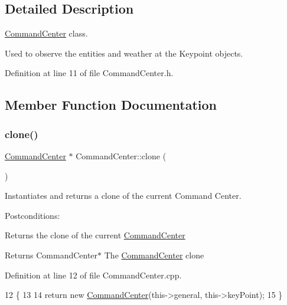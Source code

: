 \subsection{Detailed Description}
\hyperlink{classCommandCenter}{Command\+Center} class. 

Used to observe the entities and weather at the Keypoint objects. 

Definition at line 11 of file Command\+Center.\+h.



\subsection{Member Function Documentation}
\mbox{\label{classCommandCenter_aef666a19f24fd089edd089e4b2cb9542}} 
\subsubsection{\texorpdfstring{clone()}{clone()}}
{\footnotesize\ttfamily \hyperlink{classCommandCenter}{Command\+Center} $\ast$ Command\+Center\+::clone (\begin{DoxyParamCaption}{ }\end{DoxyParamCaption})}



Instantiates and returns a clone of the current Command Center. 

Postconditions\+:
\begin{DoxyItemize}
\item Returns the clone of the current \hyperlink{classCommandCenter}{Command\+Center}
\end{DoxyItemize}

\begin{DoxyReturn}{Returns}
Command\+Center$\ast$ The \hyperlink{classCommandCenter}{Command\+Center} clone 
\end{DoxyReturn}


Definition at line 12 of file Command\+Center.\+cpp.


\begin{DoxyCode}
12                                     \{
13     
14     \textcolor{keywordflow}{return} \textcolor{keyword}{new} \hyperlink{classCommandCenter_a0ecec9fd6d0a28f082665837a791ef07}{CommandCenter}(this->general, this->keyPoint);
15 \}
\end{DoxyCode}
\mbox{\label{classCommandCenter_a755d1f8677d6764a59ba8e8e4909103d}} 
